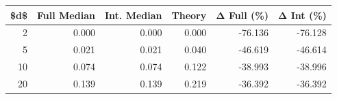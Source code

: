 \begin{tabular}{rrrrrr}
\toprule
\$d\$ & Full Median & Int. Median & Theory & Δ Full (\%) & Δ Int (\%) \\
\midrule
  2 &       0.000 &       0.000 &  0.000 &    -76.136 &   -76.128 \\
  5 &       0.021 &       0.021 &  0.040 &    -46.619 &   -46.614 \\
 10 &       0.074 &       0.074 &  0.122 &    -38.993 &   -38.996 \\
 20 &       0.139 &       0.139 &  0.219 &    -36.392 &   -36.392 \\
\bottomrule
\end{tabular}
